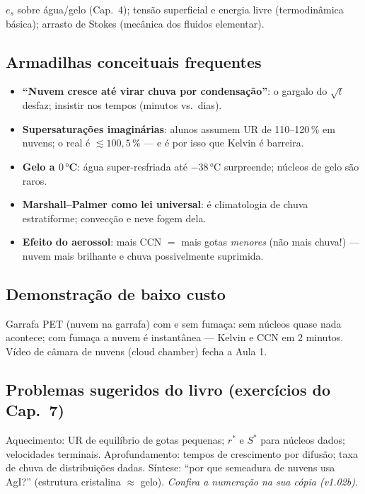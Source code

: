 $e_s$ sobre água/gelo (Cap.~4); tensão superficial e energia livre
(termodinâmica básica); arrasto de Stokes (mecânica dos fluidos elementar).

\subsection*{Armadilhas conceituais frequentes}

\begin{itemize}
  \item \textbf{``Nuvem cresce até virar chuva por condensação''}: o
        gargalo do $\sqrt t$ desfaz; insistir nos tempos (minutos vs.\
        dias).
  \item \textbf{Supersaturações imaginárias}: alunos assumem UR de
        110--120\,\% em nuvens; o real é $\lesssim 100{,}5$\,\% — e é por
        isso que Kelvin é barreira.
  \item \textbf{Gelo a $0\,°$C}: água super-resfriada até $-38\,°$C
        surpreende; núcleos de gelo são raros.
  \item \textbf{Marshall--Palmer como lei universal}: é climatologia de
        chuva estratiforme; convecção e neve fogem dela.
  \item \textbf{Efeito do aerossol}: mais CCN $=$ mais gotas \emph{menores}
        (não mais chuva!) — nuvem mais brilhante e chuva possivelmente
        suprimida.
\end{itemize}

\subsection*{Demonstração de baixo custo}

Garrafa PET (nuvem na garrafa) com e sem fumaça: sem núcleos quase nada
acontece; com fumaça a nuvem é instantânea — Kelvin e CCN em 2 minutos.
Vídeo de câmara de nuvens (cloud chamber) fecha a Aula 1.

\subsection*{Problemas sugeridos do livro (exercícios do Cap.~7)}

Aquecimento: UR de equilíbrio de gotas pequenas; $r^*$ e $S^*$ para núcleos
dados; velocidades terminais. Aprofundamento: tempos de crescimento por
difusão; taxa de chuva de distribuições dadas. Síntese: ``por que
semeadura de nuvens usa AgI?'' (estrutura cristalina $\approx$ gelo).
\emph{Confira a numeração na sua cópia (v1.02b).}

